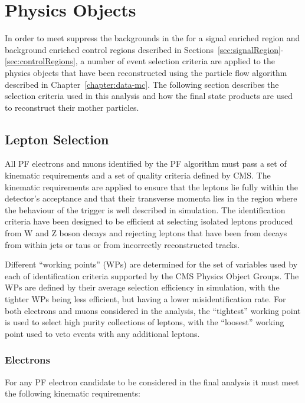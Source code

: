 \section{Physics Objects}\label{sec:physicsObjects}
In order to meet suppress the backgrounds in the for a signal enriched region and background enriched control regions described in Sections~\ref{sec:signalRegion}-\ref{sec:controlRegions}, a number of event selection criteria are applied to the physics objects that have been reconstructed using the particle flow algorithm described in Chapter~\ref{chapter:data-mc}.
The following section describes the selection criteria used in this analysis and how the final state products are used to reconstruct their mother particles.

\subsection{Lepton Selection}
All PF electrons and muons identified by the PF algorithm must pass a set of kinematic requirements and a set of quality criteria defined by CMS.
The kinematic requirements are applied to ensure that the leptons lie fully within the detector's acceptance and that their transverse momenta lies in the region where the behaviour of the trigger is well described in simulation.
The identification criteria have been designed to be efficient at selecting isolated leptons produced from W and Z boson decays and rejecting leptons that have been from decays from within jets or taus or from incorrectly reconstructed tracks.

Different ``working points'' (WPs) are determined for the set of variables used by each of identification criteria supported by the CMS Physics Object Groups.
The WPs are defined by their average selection efficiency in simulation, with the tighter WPs being less efficient, but having a lower misidentification rate.
For both electrons and muons  considered in the analysis, the ``tightest'' working point is used to select high purity collections of leptons, with the ``loosest'' working point used to veto events with any additional leptons.

\subsubsection{Electrons}\label{subsubsec:electronSelection}
For any PF electron candidate to be considered in the final analysis it must meet the following kinematic requirements:

